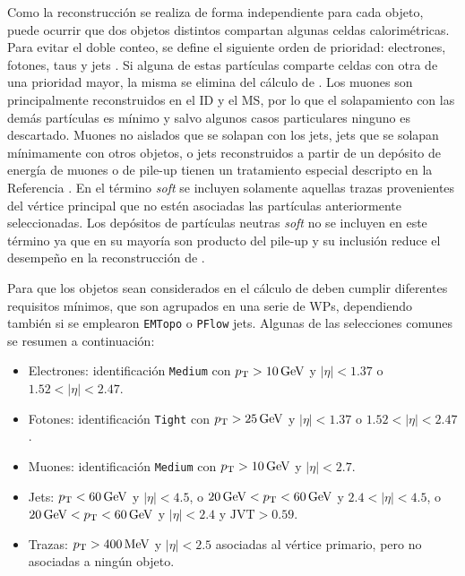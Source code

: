 Como la reconstrucción se realiza de forma independiente para cada objeto, puede ocurrir que dos objetos distintos compartan algunas celdas calorimétricas. Para evitar el doble conteo, se define el siguiente orden de prioridad: electrones, fotones, taus y jets \cite{PERF-2011-07, PERF-2014-04}. Si alguna de estas partículas comparte celdas con otra de una prioridad mayor, la misma se elimina del cálculo de \met. Los muones son principalmente reconstruidos en el ID y el MS, por lo que el solapamiento con las demás partículas es mínimo y salvo algunos casos particulares ninguno es descartado. Muones no aislados que se solapan con los jets, jets que se solapan mínimamente con otros objetos, o jets reconstruidos a partir de un depósito de energía de muones o de pile-up tienen un tratamiento especial descripto en la Referencia \cite{PERF-2016-07}. En el término \textit{soft} se incluyen solamente aquellas trazas provenientes del vértice principal que no estén asociadas las partículas anteriormente seleccionadas. Los depósitos de partículas neutras \textit{soft} no se incluyen en este término ya que en su mayoría son producto del pile-up y su inclusión reduce el desempeño en la reconstrucción de \met. 

Para que los objetos sean considerados en el cálculo de \met deben cumplir diferentes requisitos mínimos, que son agrupados en una serie de WPs, dependiendo también si se emplearon \texttt{EMTopo} o \texttt{PFlow} jets. Algunas de las selecciones comunes se resumen a continuación:

\begin{itemize}
  \item Electrones: identificación \texttt{Medium} con $p_{\text{T}}>10\,\text{GeV}$ y $|\eta|<1.37$ o $1.52<|\eta|<2.47$.
  \item Fotones: identificación \texttt{Tight} con $p_{\text{T}}>25\,\text{GeV}$ y $|\eta|<1.37$ o $1.52<|\eta|<2.47$.
  \item Muones: identificación \texttt{Medium} con $p_{\text{T}}>10\,\text{GeV}$ y $|\eta|<2.7$.
  \item Jets: $p_{\text{T}}<60\,\text{GeV}$ y $|\eta|<4.5$, o $20\,\text{GeV}<p_{\text{T}}<60\,\text{GeV}$ y $2.4<|\eta|<4.5$, o $20\,\text{GeV}<p_{\text{T}}<60\,\text{GeV}$ y $|\eta|<2.4$ y $\text{JVT}>0.59$.
  \item Trazas: $p_{\text{T}}>400\,\text{MeV}$ y $|\eta|<2.5$ asociadas al vértice primario, pero no asociadas a ningún objeto.
\end{itemize}






